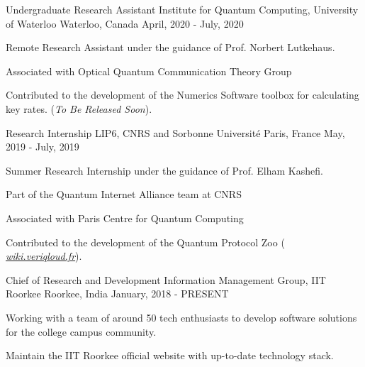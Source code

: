 

\begin{cventries}

  \cventry
    {Undergraduate Research Assistant} %
    {Institute for Quantum Computing, University of Waterloo} %
    {Waterloo, Canada} %
    {April, 2020 - July, 2020} %
    {
      \begin{cvitems} %
        \item {Remote Research Assistant under the guidance of Prof. Norbert Lutkehaus.}
        \item {Associated with Optical Quantum Communication Theory Group}
        \item {Contributed to the development of the Numerics Software toolbox for calculating key rates. (\emph{To Be Released Soon}).}
      \end{cvitems}
    }

  \cventry
    {Research Internship} %
    {LIP6, CNRS and Sorbonne Universit\'e} %
    {Paris, France} %
    {May, 2019 - July, 2019} %
    {
      \begin{cvitems} %
        \item {Summer Research Internship under the guidance of Prof. Elham Kashefi.}
        \item {Part of the Quantum Internet Alliance team at CNRS}
        \item {Associated with Paris Centre for Quantum Computing}
        \item {Contributed to the development of the Quantum Protocol Zoo (\emph{ \href{https://wiki.veriqloud.fr}{wiki.veriqloud.fr}}).}
      \end{cvitems}
    }

  \cventry
    {Chief of Research and Development} %
    {Information Management Group, IIT Roorkee} %
    {Roorkee, India} %
    {January, 2018 - PRESENT} %
    {
      \begin{cvitems} %
        \item {Working with a team of around 50 tech enthusiasts to develop software solutions for the college campus community.}
        \item {Maintain the IIT Roorkee official website with up-to-date technology stack.}
      \end{cvitems}
    }

\end{cventries}